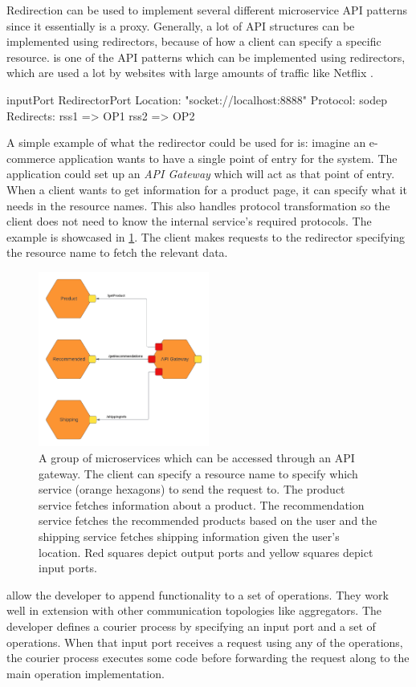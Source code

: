 Redirection can be used to implement several different microservice API patterns since it essentially is a proxy.
Generally, a lot of API structures can be implemented using redirectors, because of how a client can specify a specific resource.
 is one of the API patterns which can be implemented using redirectors, which are used a lot by websites with large amounts of traffic like Netflix \cite{optimizingnetflix}.

\begin{jolisting}[][caption={Input port which redirects requests using resource names}, label=lst:redirector-inputport]
inputPort RedirectorPort {
    Location: "socket://localhost:8888"
    Protocol: sodep
    Redirects:
        rss1 => OP1
        rss2 => OP2
}
\end{jolisting}

A simple example of what the redirector could be used for is: imagine an e-commerce application wants to have a single point of entry for the system. The application could set up an \emph{API Gateway} which will act as that point of entry. 
When a client wants to get information for a product page, it can specify what it needs in the resource names. This also handles protocol transformation so the client does not need to know the internal service's required protocols.
The example is showcased in \cref{figure:redirector_example}. The client makes requests to the redirector specifying the resource name to fetch the relevant data.
\begin{figure}[h!]
    \center
    \includegraphics[width=0.5\textwidth]{figures/redirector_example.png}
    \caption{A group of microservices which can be accessed through an API gateway. 
    The client can specify a resource name to specify which service (orange hexagons) to send the request to.
    The product service fetches information about a product. The recommendation service fetches
    the recommended products based on the user and the shipping service fetches shipping information given the user's location.
    Red squares depict output ports and yellow squares depict input ports.}
    \label{figure:redirector_example}
\end{figure}
 allow the developer to append functionality to a set of operations. They work well in extension with other communication topologies like aggregators.
The developer defines a courier process by specifying an input port and a set of operations. When that input port receives a request using any of the operations, the courier process executes some code before forwarding
the request along to the main operation implementation.

